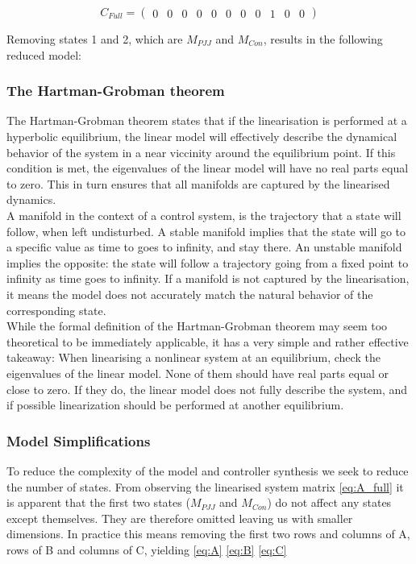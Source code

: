 \begin{equation}  \label{eq:C_full}
	C_{Full} =\left(\begin{array}{ccccccccccc}
		0 & 0 & 0 & 0 & 0 & 0 & 0 & 0 & 1 & 0 & 0
	\end{array}\right)
\end{equation}

Removing states 1 and 2, which are $M_{PJJ}$ and $M_{Con}$, results in the following reduced model:











\subsubsection{The Hartman-Grobman theorem}

The Hartman-Grobman theorem states that if the linearisation is performed at a hyperbolic equilibrium, the linear model will effectively describe the dynamical behavior of the system in a near viccinity around the equilibrium point. If this condition is met, the eigenvalues of the linear model will have no real parts equal to zero. This in turn ensures that all manifolds are captured by the linearised dynamics. \\
A manifold in the context of a control system, is the trajectory that a state will follow, when left undisturbed. A stable manifold implies that the state will go to a specific value as time to goes to infinity, and stay there. An unstable manifold implies the opposite: the state will follow a trajectory going from a fixed point to infinity as time goes to infinity. If a manifold is not captured by the linearisation, it means the model does not accurately match the natural behavior of the corresponding state.\\

While the formal definition of the Hartman-Grobman theorem may seem too theoretical to be immediately applicable, it has a very simple and rather effective takeaway: When linearising a nonlinear system at an equilibrium, check the eigenvalues of the linear model. None of them should have real parts equal or close to zero. If they do, the linear model does not fully describe the system, and if possible linearization should be performed at another equilibrium.


\subsubsection{Model Simplifications}
To reduce the complexity of the model and controller synthesis we seek to reduce the number of states.
From observing the linearised system matrix \cref{eq:A_full} it is apparent that the first two states ($M_{PJJ}$ and $M_{Con}$) do not affect any states except themselves. They are therefore omitted leaving us with smaller dimensions. In practice this means removing the first two rows and columns of A, rows of B and columns of C, yielding \cref{eq:A} \cref{eq:B} \cref{eq:C}

